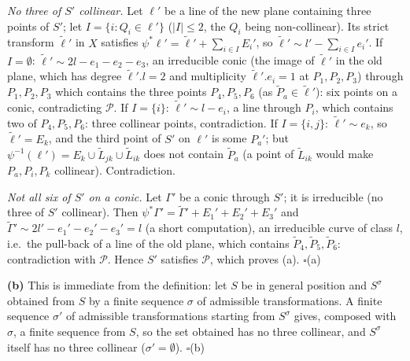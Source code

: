 \documentclass[11pt]{article}
\begin{document}
\emph{No three of $S'$ collinear.} Let $\ell'$ be a line of the new plane containing three points of $S'$; let $I=\{i:Q_i\in\ell'\}$ ($|I|\le2$, the $Q_i$ being non-collinear). Its strict transform $\widetilde\ell'$ in $X$ satisfies $\psi^*\ell'=\widetilde\ell'+\sum_{i\in I}E_i'$, so $\widetilde\ell'\sim l'-\sum_{i\in I}e_i'$. If $I=\emptyset$: $\widetilde\ell'\sim2l-e_1-e_2-e_3$, an irreducible conic (the image of $\widetilde\ell'$ in the old plane, which has degree $\widetilde\ell'.l=2$ and multiplicity $\widetilde\ell'.e_i=1$ at $P_1,P_2,P_3$) through $P_1,P_2,P_3$ which contains the three points $P_4,P_5,P_6$ (as $\widetilde P_a\in\widetilde\ell'$): six points on a conic, contradicting $\mathcal P$. If $I=\{i\}$: $\widetilde\ell'\sim l-e_i$, a line through $P_i$, which contains two of $P_4,P_5,P_6$: three collinear points, contradiction. If $I=\{i,j\}$: $\widetilde\ell'\sim e_k$, so $\widetilde\ell'=E_k$, and the third point of $S'$ on $\ell'$ is some $P_a'$; but $\psi^{-1}(\ell')=E_k\cup\widetilde L_{jk}\cup\widetilde L_{ik}$ does not contain $\widetilde P_a$ (a point of $\widetilde L_{ik}$ would make $P_a,P_i,P_k$ collinear). Contradiction.

\emph{Not all six of $S'$ on a conic.} Let $\Gamma'$ be a conic through $S'$; it is irreducible (no three of $S'$ collinear). Then $\psi^*\Gamma'=\widetilde\Gamma'+E_1'+E_2'+E_3'$ and $\widetilde\Gamma'\sim2l'-e_1'-e_2'-e_3'=l$ (a short computation), an irreducible curve of class $l$, i.e.\ the pull-back of a line of the old plane, which contains $\widetilde P_4,\widetilde P_5,\widetilde P_6$: contradiction with $\mathcal P$. Hence $S'$ satisfies $\mathcal P$, which proves (a). \hfill$\square$(a)

\textbf{(b)} This is immediate from the definition: let $S$ be in general position and $S^\sigma$ obtained from $S$ by a finite sequence $\sigma$ of admissible transformations. A finite sequence $\sigma'$ of admissible transformations starting from $S^\sigma$ gives, composed with $\sigma$, a finite sequence from $S$, so the set obtained has no three collinear, and $S^\sigma$ itself has no three collinear ($\sigma'=\emptyset$). \hfill$\square$(b)
\end{document}
